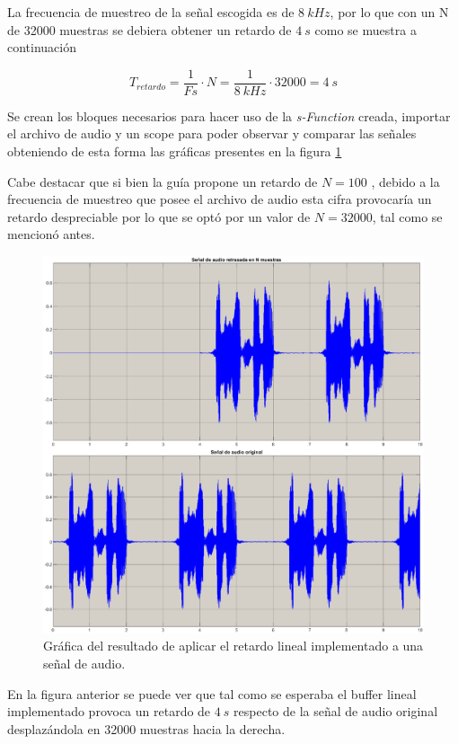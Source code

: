 \begin{enumerate}
    
    La frecuencia de muestreo de la señal escogida es de  $8~kHz$, por lo que con un N de 32000 muestras se debiera obtener un retardo de $4~s$ como se muestra a continuación
    
    $$T_{retardo} = \frac{1}{Fs}\cdot N = \frac{1}{8 ~kHz}\cdot 32000 = 4~s$$
    
     Se crean los bloques necesarios para hacer uso de la \textit{s-Function} creada, importar el archivo de audio y un scope para poder observar y comparar las señales obteniendo de esta forma las gráficas presentes en la figura \ref{retardo_lineal}  
    
    Cabe destacar que si bien la guía propone un retardo de $N = 100$ , debido a la frecuencia de muestreo que posee el archivo de audio esta cifra provocaría un retardo despreciable por lo que se optó por un  valor de $N = 32000$, tal como se mencionó antes.
    
    \begin{figure}[H]
        \centering
        \includegraphics[scale = 0.5]{Figuras/p31_retardo_lineal.eps}
        \caption{Gráfica del resultado de aplicar el retardo lineal implementado a una señal de audio.}
        \label{retardo_lineal}
    \end{figure}
    
    En la figura anterior se puede ver que tal como se esperaba el buffer lineal implementado provoca un retardo de $4~s$ respecto de la señal de audio original desplazándola en 32000 muestras  hacia la derecha.
    

\end{enumerate}
